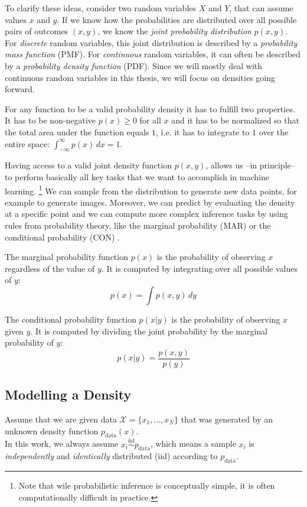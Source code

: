To clarify these ideas, consider two random variables $X$ and $Y$, that can assume values $x$ and $y$. 
If we know how the probabilities are distributed over all possible pairs of outcomes $(x, y)$, we know the \textit{joint probability distribution} $p(x, y)$.
For \textit{discrete} random variables, this joint distribution is described by a \textit{probability mass function} (PMF). 
For \textit{continuous} random variables, it can often be described by a \textit{probability density function} (PDF).
Since we will mostly deal with continuous random variables in this thesis, we will focus on densities going forward.

For any function to be a valid probability density it has to fulfill two properties. 
It has to be non-negative $p(x) \geq 0$ for all $x$
and it has to be normalized so that the total area under the function equals $1$, i.e. it has to integrate to $1$ over the entire space: $\int_{-\infty}^{\infty} p(x) \, dx = 1$.

Having access to a valid joint density function $p(x, y)$, allows us --in principle-- to perform basically all key tasks that we want to accomplish in machine learning. \footnote{Note that wile probabilistic inference is conceptually simple, it is often computationally difficult in practice.}
We can sample from the distribution to generate new data points, for example to generate images. Moreover, we can predict by evaluating the density at a specific point and 
we can compute more complex inference tasks by using rules from probability theory, like the marginal probability (MAR) or 
the conditional probability (CON) \cite{pc_intro}.

The marginal probability function $p(x)$ is the probability of observing $x$ regardless of the value of $y$. 
It is computed by integrating over all possible values of $y$:
\[
    p(x) = \int p(x, y) \, dy
\]

The conditional probability function $p(x|y)$ is the probability of observing $x$ given $y$.
It is computed by dividing the joint probability by the marginal probability of $y$:
\[
    p(x|y) = \frac{p(x, y)}{p(y)}
\]

\subsection{Modelling a Density}
\label{sec:modelling_a_density}

Assume that we are given data $ \mathcal{X} = \{x_1, ..., x_N\}$ that was generated by an unknown density function $p_{\text{data}}(x)$. \\
In this work, we always assume $x_i \overset{\text{iid}}{\sim} p_{\text{data}}$, which means 
a sample $x_i$ is \emph{independently} and \emph{identically} distributed (iid) according to $p_{\text{data}}$.

